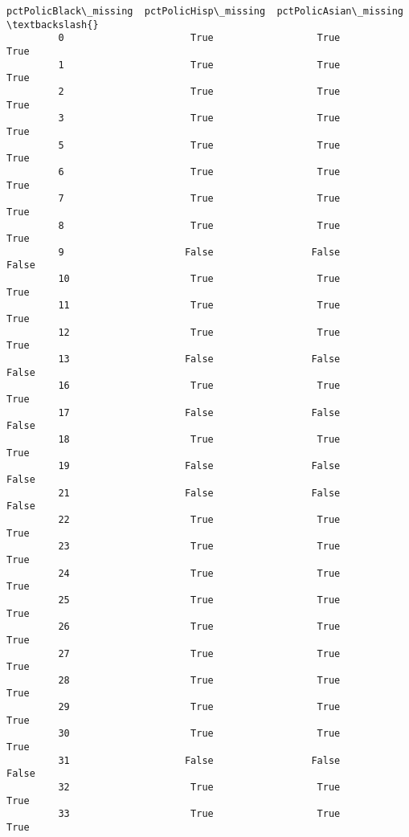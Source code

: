 \documentclass[11pt]{llncs}
\begin{document}
\begin{Verbatim}[commandchars=\\\{\}]
               pctPolicBlack\_missing  pctPolicHisp\_missing  pctPolicAsian\_missing  \textbackslash{}
         0                      True                  True                   True   
         1                      True                  True                   True   
         2                      True                  True                   True   
         3                      True                  True                   True   
         5                      True                  True                   True   
         6                      True                  True                   True   
         7                      True                  True                   True   
         8                      True                  True                   True   
         9                     False                 False                  False   
         10                     True                  True                   True   
         11                     True                  True                   True   
         12                     True                  True                   True   
         13                    False                 False                  False   
         16                     True                  True                   True   
         17                    False                 False                  False   
         18                     True                  True                   True   
         19                    False                 False                  False   
         21                    False                 False                  False   
         22                     True                  True                   True   
         23                     True                  True                   True   
         24                     True                  True                   True   
         25                     True                  True                   True   
         26                     True                  True                   True   
         27                     True                  True                   True   
         28                     True                  True                   True   
         29                     True                  True                   True   
         30                     True                  True                   True   
         31                    False                 False                  False   
         32                     True                  True                   True   
         33                     True                  True                   True   

\end{Verbatim}
\end{document}
